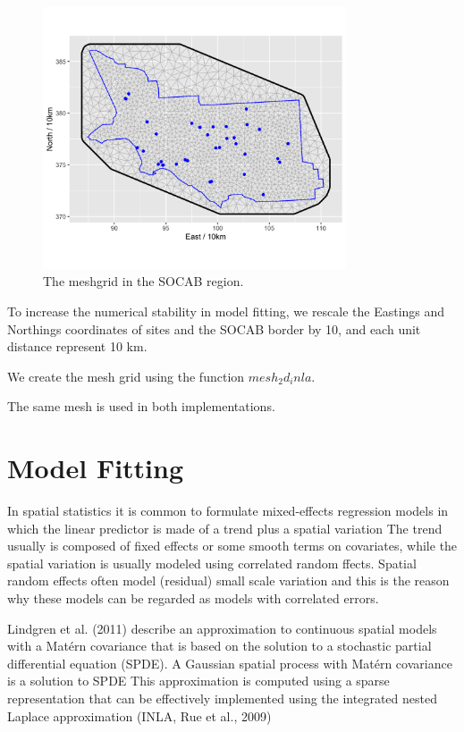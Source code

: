 \begin{figure}[ht]
	\centering
	\includegraphics[width = 0.8\textwidth]{socab_plots/SOCAB_meshgrid.png}
	\caption{The meshgrid in the SOCAB region.}
	\label{fig:socab_meshgrid}
\end{figure}

To increase the numerical stability in model fitting, we rescale the Eastings and Northings 
coordinates of sites and the SOCAB border by 10, and each unit distance represent 10 km.

We create the mesh grid using the function $mesh_2d_inla$. 

The same mesh is used in both implementations. 


\section{Model Fitting}
In spatial statistics it is common to formulate mixed-eﬀects regression models in which the linear predictor is made of a trend plus a spatial variation
The trend usually is composed of ﬁxed eﬀects or some smooth terms on covariates, while the spatial variation is usually modeled using correlated random ffects.
Spatial random eﬀects often model (residual) small scale variation and this is the reason why these models can be regarded as models with correlated errors.

Lindgren et al. (2011) describe an approximation to continuous spatial models with a Matérn
covariance that is based on the solution to a stochastic partial diﬀerential equation (SPDE). 
A Gaussian spatial process with Matérn covariance is a solution to SPDE
This approximation is computed using a sparse representation that can be eﬀectively implemented using the integrated nested Laplace approximation (INLA, Rue et al., 2009)

